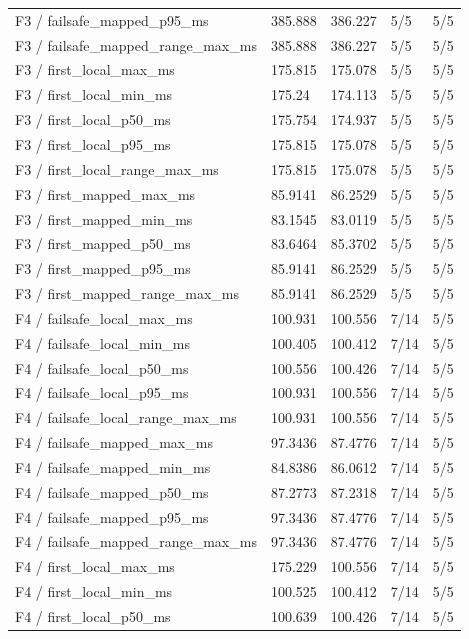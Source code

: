 \begin{tabular}{@{}lllll@{}}
F3 / failsafe\_mapped\_p95\_ms & 385.888 & 386.227 & 5/5 & 5/5 \\
F3 / failsafe\_mapped\_range\_max\_ms & 385.888 & 386.227 & 5/5 & 5/5 \\
F3 / first\_local\_max\_ms & 175.815 & 175.078 & 5/5 & 5/5 \\
F3 / first\_local\_min\_ms & 175.24 & 174.113 & 5/5 & 5/5 \\
F3 / first\_local\_p50\_ms & 175.754 & 174.937 & 5/5 & 5/5 \\
F3 / first\_local\_p95\_ms & 175.815 & 175.078 & 5/5 & 5/5 \\
F3 / first\_local\_range\_max\_ms & 175.815 & 175.078 & 5/5 & 5/5 \\
F3 / first\_mapped\_max\_ms & 85.9141 & 86.2529 & 5/5 & 5/5 \\
F3 / first\_mapped\_min\_ms & 83.1545 & 83.0119 & 5/5 & 5/5 \\
F3 / first\_mapped\_p50\_ms & 83.6464 & 85.3702 & 5/5 & 5/5 \\
F3 / first\_mapped\_p95\_ms & 85.9141 & 86.2529 & 5/5 & 5/5 \\
F3 / first\_mapped\_range\_max\_ms & 85.9141 & 86.2529 & 5/5 & 5/5 \\
F4 / failsafe\_local\_max\_ms & 100.931 & 100.556 & 7/14 & 5/5 \\
F4 / failsafe\_local\_min\_ms & 100.405 & 100.412 & 7/14 & 5/5 \\
F4 / failsafe\_local\_p50\_ms & 100.556 & 100.426 & 7/14 & 5/5 \\
F4 / failsafe\_local\_p95\_ms & 100.931 & 100.556 & 7/14 & 5/5 \\
F4 / failsafe\_local\_range\_max\_ms & 100.931 & 100.556 & 7/14 & 5/5 \\
F4 / failsafe\_mapped\_max\_ms & 97.3436 & 87.4776 & 7/14 & 5/5 \\
F4 / failsafe\_mapped\_min\_ms & 84.8386 & 86.0612 & 7/14 & 5/5 \\
F4 / failsafe\_mapped\_p50\_ms & 87.2773 & 87.2318 & 7/14 & 5/5 \\
F4 / failsafe\_mapped\_p95\_ms & 97.3436 & 87.4776 & 7/14 & 5/5 \\
F4 / failsafe\_mapped\_range\_max\_ms & 97.3436 & 87.4776 & 7/14 & 5/5 \\
F4 / first\_local\_max\_ms & 175.229 & 100.556 & 7/14 & 5/5 \\
F4 / first\_local\_min\_ms & 100.525 & 100.412 & 7/14 & 5/5 \\
F4 / first\_local\_p50\_ms & 100.639 & 100.426 & 7/14 & 5/5 \\

\end{tabular}
